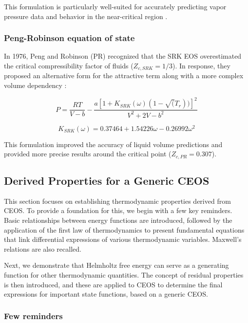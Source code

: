 	This formulation is particularly well-suited for accurately predicting vapor
	pressure data and behavior in the near-critical region
	\cite{tosun2021thermodynamics}.

	\subsubsection{Peng-Robinson equation of state}

	In 1976, Peng and Robinson (PR) recognized that the SRK EOS overestimated
	the critical compressibility factor of fluids ($Z_{c,SRK} = 1/3$). In response,
	they proposed an alternative form for the attractive term along with a more
	complex volume dependency \cite{peng1976new}:

	\begin{equation}
		P = \frac{RT}{V-b}-\frac{a[1+K_{SRK}(\omega)(1-\sqrt(T_r))]^2}{V^2 +2V -b^2}
	\end{equation}

	\begin{equation}
		K_{SRK}(\omega) = 0.37464 + 1.54226\omega -0.26992\omega^2
	\end{equation}

	This formulation improved the accuracy of liquid volume predictions and
	provided more precise results around the critical point ($Z_{c,PR} = 0.307$).

	\subsection{Derived Properties for a Generic CEOS}
	This section focuses on establishing thermodynamic properties derived from
	CEOS. To provide a foundation for this, we begin with a few key reminders.
	Basic relationships between energy functions are introduced, followed by the
	application of the first law of thermodynamics to present fundamental
	equations that link differential expressions of various thermodynamic
	variables. Maxwell's relations are also recalled.

	Next, we demonstrate that Helmholtz free energy can serve as a generating
	function for other thermodynamic quantities. The concept of residual properties
	is then introduced, and these are applied to CEOS to determine the final
	expressions for important state functions, based on a generic CEOS.

	\subsubsection{Few reminders}

